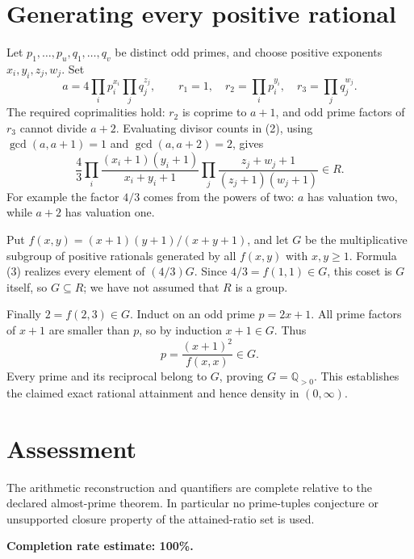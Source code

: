 \documentclass[11pt]{article}
\begin{document}
\section*{Generating every positive rational}
Let $p_1,\ldots,p_u,q_1,\ldots,q_v$ be distinct odd primes, and choose positive exponents $x_i,y_i,z_j,w_j$. Set
\[
 a=4\prod_i p_i^{x_i}\prod_j q_j^{z_j},\qquad
 r_1=1,\quad r_2=\prod_i p_i^{y_i},\quad r_3=\prod_j q_j^{w_j}.
\]
The required coprimalities hold: $r_2$ is coprime to $a+1$, and odd prime factors of $r_3$ cannot divide $a+2$. Evaluating divisor counts in (2), using $\gcd(a,a+1)=1$ and $\gcd(a,a+2)=2$, gives
\[
 \frac43\prod_i\frac{(x_i+1)(y_i+1)}{x_i+y_i+1}
       \prod_j\frac{z_j+w_j+1}{(z_j+1)(w_j+1)}\in R.\tag{3}
\]
For example the factor $4/3$ comes from the powers of two: $a$ has valuation two, while $a+2$ has valuation one.

Put $f(x,y)=(x+1)(y+1)/(x+y+1)$, and let $G$ be the multiplicative subgroup of positive rationals generated by all $f(x,y)$ with $x,y\ge1$. Formula (3) realizes every element of $(4/3)G$. Since $4/3=f(1,1)\in G$, this coset is $G$ itself, so $G\subseteq R$; we have not assumed that $R$ is a group.

Finally $2=f(2,3)\in G$. Induct on an odd prime $p=2x+1$. All prime factors of $x+1$ are smaller than $p$, so by induction $x+1\in G$. Thus
\[
 p=\frac{(x+1)^2}{f(x,x)}\in G.
\]
Every prime and its reciprocal belong to $G$, proving $G=\mathbb Q_{>0}$. This establishes the claimed exact rational attainment and hence density in $(0,\infty)$.

\section*{Assessment}
The arithmetic reconstruction and quantifiers are complete relative to the declared almost-prime theorem. In particular no prime-tuples conjecture or unsupported closure property of the attained-ratio set is used.

\textbf{Completion rate estimate: 100\%.}
\end{document}
